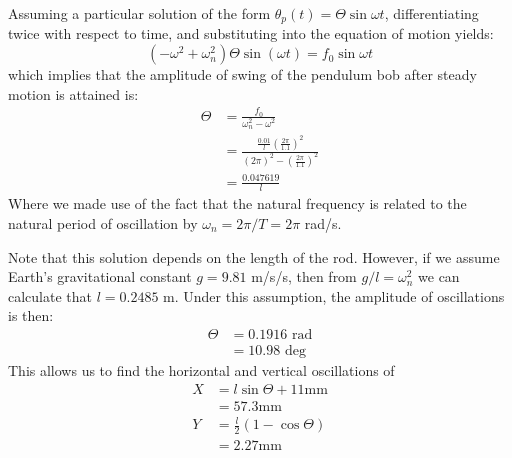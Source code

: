 \documentclass[letter, 11pt]{article}
\begin{document}
Assuming a particular solution of the form $\theta_p(t) =
\Theta\sin\omega t$, differentiating twice with respect
to time, and substituting into the equation of motion yields:
\[
(-\omega^2 + \omega_n^2)\Theta \sin\left(\omega t \right) = f_0 \sin
\omega t
\]
which implies that the amplitude of swing of the pendulum bob after steady
motion is attained is:
\begin{align*}
  \Theta &= \frac{f_0}{\omega_n^2 - \omega^2} \\
         &= \frac{\frac{0.01}{l}\left(\frac{2\pi}{1.1}\right)^2}{(2\pi)^2 -
         (\frac{2\pi}{1.1})^2} \\
         &= \frac{0.047619}{l}
\end{align*}
Where we made use of the fact that the natural frequency is related to the
natural period of oscillation by $\omega_n = 2\pi / T = 2\pi$ rad/s.

Note that this solution depends on the length of the rod.  However, if we
assume Earth's gravitational constant $g=9.81$ m/s/s, then from $g/l=\omega_n^2$ we
can calculate that $l = 0.2485$ m.  Under this assumption, the amplitude of
oscillations is then:
\begin{align*}
  \Theta &= 0.1916 \text{ rad}\\
         &= 10.98  \text{ deg}
\end{align*}
This allows us to find the horizontal and vertical oscillations of
\begin{align*}
  X &= l\sin\Theta + 11\text{mm}\\
    &= 57.3 \text{mm}\\
  Y &= \frac{l}{2}(1 - \cos\Theta)\\
    &= 2.27 \text{mm}
\end{align*}
\end{document}
